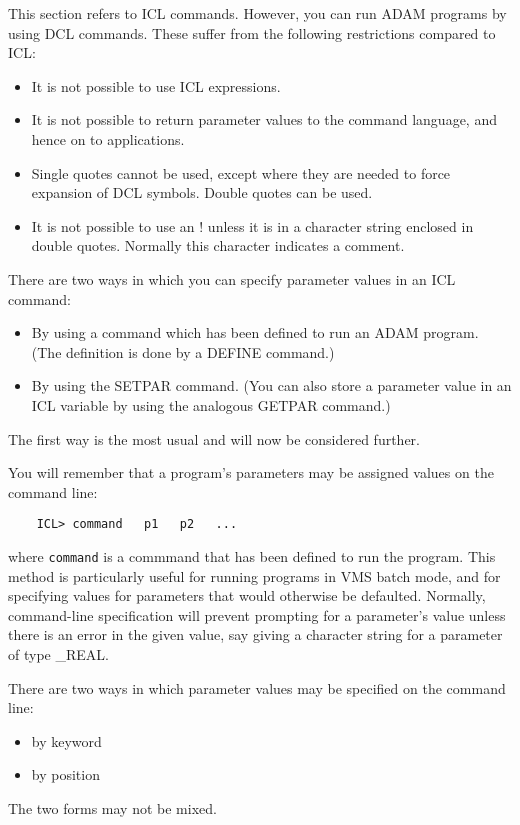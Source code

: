 This section refers to ICL commands.
However, you can run ADAM programs by using DCL commands.
These suffer from the following restrictions compared to ICL:
\begin{itemize}
\item It is not possible to use ICL expressions.
\item It is not possible to return parameter values to the command language, and
hence on to applications.
\item Single quotes cannot be used, except where they are needed to force
expansion of DCL symbols.
Double quotes can be used.
\item It is not possible to use an ! unless it is in a character string
enclosed in double quotes.
Normally this character indicates a comment.
\end{itemize}
There are two ways in which you can specify parameter values in an ICL command:
\begin{itemize}
\item By using a command which has been defined to run an ADAM program.
 (The definition is done by a DEFINE command.)
\item By using the SETPAR command.
(You can also store a parameter value in an ICL variable by using the
analogous GETPAR command.)
\end{itemize}
The first way is the most usual and will now be considered further.

You will remember that a program's parameters may be assigned values on the
command line:

\begin{small}
\begin{verbatim}
    ICL> command   p1   p2   ...
\end{verbatim}
\end{small}

where {\tt command} is a commmand that has been defined to run the program.
This method is particularly useful for running programs in VMS batch mode,
and for specifying values for parameters that would otherwise be defaulted.
Normally, command-line specification will prevent prompting for a parameter's
value unless there is an error in the given value, say giving a character
string for a parameter of type \_REAL.

There are two ways in which parameter values may be specified on the command
line:
\begin{itemize}
\item by keyword
\item by position
\end{itemize}
The two forms may not be mixed.


